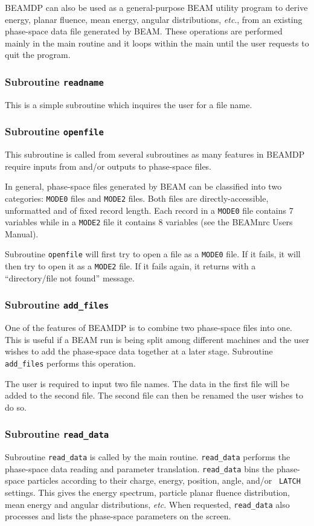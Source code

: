 \documentclass[12pt,twoside]{article}
\newcommand{\etc}{{\em etc}}
\begin{document}
BEAMDP can also be used as a general-purpose  BEAM utility program to derive energy, planar fluence, mean energy, angular distributions, \etc., from an existing phase-space data file generated by BEAM. These operations are performed mainly in the main routine and it loops within the main until the user requests to quit the program.

\subsubsection{Subroutine {\tt readname}}
This is a simple subroutine which inquires the user for a file name.

\subsubsection{Subroutine {\tt openfile}}
This subroutine is called from several subroutines as many features in
BEAMDP require inputs from and/or outputs to phase-space files.

In general, phase-space files generated by BEAM can be classified into two
categories: {\tt MODE0} files and {\tt MODE2} files. Both files are
directly-accessible, unformatted and of fixed record length. Each record
in a {\tt MODE0} file contains 7 variables while in a {\tt MODE2} file it
contains 8 variables (see the BEAMnrc Users Manual\cite{Ro04a}).

Subroutine {\tt openfile} will first try to open a file as a {\tt MODE0}
file. If it fails, it will then try to open it as a {\tt MODE2} file. If it
fails again, it returns with a ``directory/file not found''  message.
\subsubsection{Subroutine {\tt add\_files}} One of the features of BEAMDP
is to combine two phase-space files into one. This is useful if a BEAM run
is being split among different machines and the user wishes to add the
phase-space data together at a later stage. Subroutine {\tt add\_files}
performs this operation.

The user is required to input two file names. The data in the first file will be added to the second file. The second file can then be renamed  the user wishes to do so.

\subsubsection{Subroutine {\tt read\_data}} Subroutine {\tt read\_data} is
called by the main routine. {\tt read\_data} performs the phase-space data
reading and parameter translation. {\tt read\_data} bins the phase-space
particles according to their charge, energy, position, angle, and/or {\tt
LATCH} settings. This gives the energy spectrum, particle planar fluence
distribution, mean energy and angular distributions, \etc. When requested,
{\tt read\_data} also processes and lists the phase-space parameters on
the screen.
\end{document}
